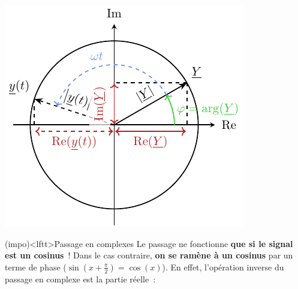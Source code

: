\documentclass[../../main/main.tex]{subfiles}
\begin{document}
\begin{tcb*}[sidebyside, righthand ratio=.4]
\begin{center}
{		}{%
			\includegraphics[width=\linewidth]{cplx_pres-xy_prof}
		}%
	\end{center}
\end{tcb*}

\begin{tcb}(impo)<lftt>{Passage en complexes}
	Le passage ne fonctionne \textbf{que si le signal est un cosinus}~! Dans le
	cas contraire, \textbf{on se ramène à un cosinus} par un terme de phase
	($\sin(x+\frac{\pi}{2}) = \cos(x)$).
	\smallbreak
	En effet, l'opération inverse du passage en complexe est la partie réelle~:
	\vspace{-15pt}
\end{tcb}
\end{document}
